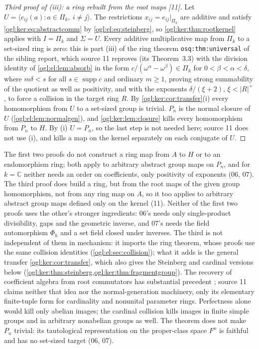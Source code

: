 \documentclass[11pt,oneside]{article}
\numberwithin{equation}{section}
\theoremstyle{definition}
\theoremstyle{remark}
\newcommand{\C}{\mathbb C}
\newcommand{\supp}{\operatorname{supp}}
\newcommand{\src}[1]{\textup{\textsf{\small[#1]}}}
\newcommand{\replabel}[1]{\nolinkurl{#1}}
\begin{document}
\begin{proof}[Third proof of (iii): a ring rebuilt from the root maps \src{11}]
Let $U=\langle e_{ij}(a):a\in\Pi_k,\ i\ne j\rangle$. The restrictions
$x_{ij}=e_{ij}|_{\Pi_k}$ are additive and satisfy
\eqref{ogl:ker:eq:abstractcomm} by \eqref{ogl:el:eq:steinberg}, so
\cref{ogl:ker:thm:rootkernel} applies with $I=\Pi_k$ and $\Sigma=U$. Every
additive multiplicative map from $\Pi_k$ to a set-sized ring is zero: this is
part (iii) of the ring theorem \replabel{osq:thm:universal} of the sibling
report, which source 11 reproves (its Theorem~3.3) with the division
identity of \cref{ogl:el:lem:absorb} in the form $c/(\omega^\alpha-\omega^\beta)\in\Pi_k$
for $0<\beta<\alpha<\delta$, where $m\delta<s$ for all $s\in\supp c$ and
ordinary $m\ge1$, proving strong summability of the quotient as well as
positivity, and with the exponents $\delta/(\xi+2)$, $\xi<|R|^+$, to force a
collision in the target ring $R$. By \cref{ogl:ker:cor:transfer}(i) every
homomorphism from $U$ to a set-sized group is trivial. $P_n$ is the normal
closure of $U$ (\cref{ogl:el:lem:normalgen}), and \cref{ogl:ker:lem:closure}
kills every homomorphism from $P_n$ to $H$. By (i) $U=P_n$, so the last step is
not needed here; source 11 does not use (i), and kills a map on the kernel
separately on each conjugate of $U$.
\end{proof}

The first two proofs do not construct a ring map from $A$ to $H$ or to an
endomorphism ring; both apply to arbitrary abstract group maps on $P_n$, and for
$k=\C$ neither needs an order on coefficients, only positivity of exponents
(06, 07). The third proof does build a ring, but from the root maps of the
given group homomorphism, not from any ring map on $A$, so it too applies to
arbitrary abstract group maps defined only on the kernel (11). Neither of the
first two proofs uses the other's stronger ingredients: 06's needs only
single-product divisibility, gaps and the geometric inverse, and 07's needs the
field automorphism $\Phi_h$ and a set field closed under inverses. The third
is not independent of them in mechanism: it imports the ring theorem, whose
proofs use the same collision identities (\cref{ogl:el:sec:collision}); what
it adds is the general transfer \cref{ogl:ker:cor:transfer}, which also gives
the Steinberg and cardinal versions below
(\cref{ogl:ker:thm:steinberg,ogl:ker:thm:fragmentgroup}). The recovery of
coefficient algebra from root commutators has substantial precedent
\cite{Voronetsky}; source 11 claims neither that idea nor the
normal-generation machinery, only its elementary finite-tuple form for
cardinality and nonunital parameter rings.
Perfectness alone would kill only abelian images; the cardinal collision kills
images in finite simple groups and in arbitrary nonabelian groups as well. The
theorem does not make $P_n$ trivial: its tautological representation on the
proper-class space $F^n$ is faithful and has no set-sized target (06, 07).
\end{document}
